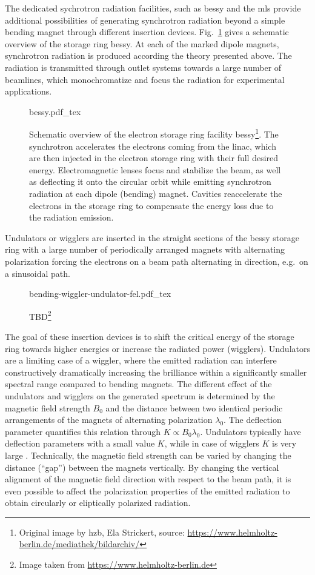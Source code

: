 The dedicated sychrotron radiation facilities, such as \gls{bessy} and the \gls{mls} provide additional possibilities of generating synchrotron radiation beyond a simple bending magnet through different insertion devices. Fig.~\ref{ch_exp:fig_bessy2} gives a schematic overview of the storage ring \gls{bessy}. At each of the marked dipole magnets, synchrotron radiation is produced according the theory presented above. The radiation is transmitted through outlet systems towards a large number of beamlines, which monochromatize and focus the radiation for experimental applications.
\begin{figure}[htb]
    \def\svgwidth{0.7\textwidth}
    {bessy.pdf_tex}
    \caption[Schematic overview of BESSY II.]{Schematic overview of the electron storage ring facility \gls{bessy}\footnote{Original image by \gls{hzb}, Ela Strickert, source: \url{https://www.helmholtz-berlin.de/mediathek/bildarchiv/}}. The synchrotron accelerates the electrons coming from the \gls{linac}, which are then injected in the electron storage ring with their full desired energy. Electromagnetic lenses focus and stabilize the beam, as well as deflecting it onto the circular orbit while emitting synchrotron radiation at each dipole (bending) magnet. Cavities reaccelerate the electrons in the storage ring to compensate the energy loss due to the radiation emission.}
    \label{ch_exp:fig_bessy2}
\end{figure}
Undulators or wigglers are inserted in the straight sections of the \gls{bessy} storage ring with a large number of periodically arranged magnets with alternating polarization forcing the electrons on a beam path alternating in direction, e.g.~on a sinusoidal path.
\begin{figure}[htb]
    \def\svgwidth{0.7\textwidth}
    {bending-wiggler-undulator-fel.pdf_tex}
    \caption[Schematic principle of insertion devices.]{TBD\footnote{Image taken from \url{https://www.helmholtz-berlin.de}}}
    \label{ch_exp:fig_bending-wiggler-undulator-fel}
\end{figure}
The goal of these insertion devices is to shift the critical energy of the storage ring towards higher energies or increase the radiated power (wigglers). Undulators are a limiting case of a wiggler, where the emitted radiation can interfere constructively dramatically increasing the brilliance within a significantly smaller spectral range compared to bending magnets. The different effect of the undulators and wigglers on the generated spectrum is determined by the magnetic field strength $B_0$ and the distance between two identical periodic arrangements of the magnets of alternating polarization $\lambda_0$. The deflection parameter quantifies this relation through $K \propto B_0 \lambda_0$. Undulators typically have deflection parameters with a small value $K$, while in case of wigglers $K$ is very large \cite{munro_chapter_1987}. Technically, the magnetic field strength can be varied by changing the distance (``gap'') between the magnets vertically. By changing the vertical alignment of the magnetic field direction with respect to the beam path, it is even possible to affect the polarization properties of the emitted radiation to obtain circularly or eliptically polarized radiation.
